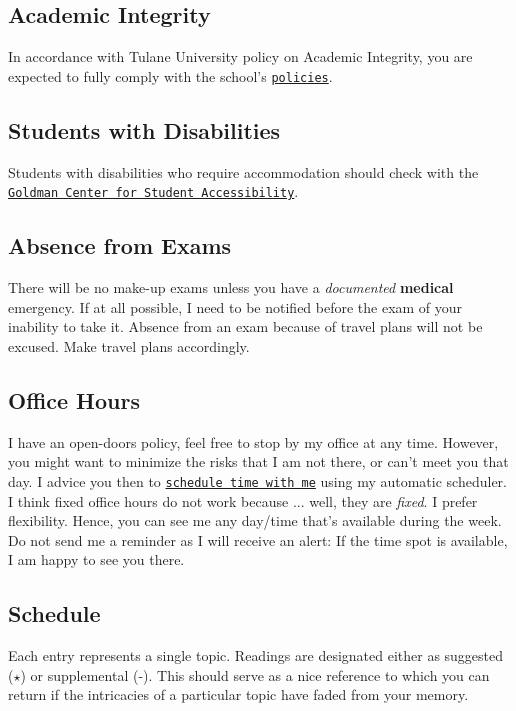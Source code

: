 \documentclass[letterpaper]{article}
\begin{document}
\subsection*{Academic Integrity}
In accordance with Tulane University policy on Academic Integrity, you are expected to fully comply with the school's \href{https://college.tulane.edu/code-of-academic-conduct}{\texttt{policies}}. 


\subsection*{Students with Disabilities}
Students with disabilities who require accommodation should check with the \href{https://accessibility.tulane.edu/}{\texttt{Goldman Center for Student Accessibility}}.


\subsection*{Absence from Exams}


There will be no make-up exams unless you have a \emph{documented} {\bf medical} emergency. If at all possible, I need to be notified before the exam of your inability to take it. Absence from an exam because of travel plans will not be excused. Make travel plans accordingly. 


\subsection*{Office Hours}

I have an open-doors policy, feel free to stop by my office at any time. However, you might want to minimize the risks that I am not there, or can't meet you that day. I advice you then to \href{https://calendly.com/bahamonde/officehours}{\texttt{schedule time with me}} using my automatic scheduler. I think fixed office hours do not work because ... well, they are \emph{fixed}. I prefer flexibility. Hence, you can see me any day/time that's available during the week. Do not send me a reminder as I will receive an alert: If the time spot is available, I am happy to see you there.



\subsection*{Schedule}


Each entry represents a single topic. Readings are designated either as suggested ($\star$) or supplemental (-). This should serve as a nice reference to which you can return if the intricacies of a particular topic have faded from your memory.
\end{document}

